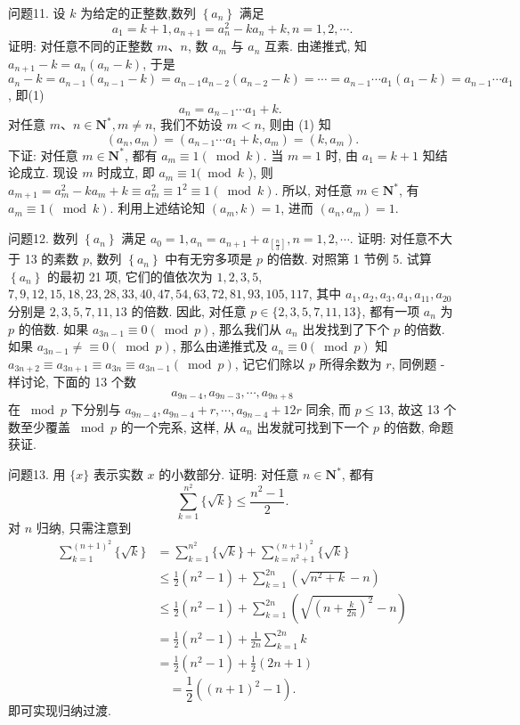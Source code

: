 问题11. 设 $k$ 为给定的正整数,数列 $\left\{a_n\right\}$ 满足
$$
a_1=k+1, a_{n+1}=a_n^2-k a_n+k, n=1,2, \cdots .
$$
证明: 对任意不同的正整数 $m 、 n$, 数 $a_m$ 与 $a_n$ 互素.
由递推式, 知 $a_{n+1}-k=a_n\left(a_n-k\right)$, 于是 $a_n-k=a_{n-1}\left(a_{n-1}-k\right)= a_{n-1} a_{n-2}\left(a_{n-2}-k\right)=\cdots=a_{n-1} \cdots a_1\left(a_1-k\right)=a_{n-1} \cdots a_1$, 即(1)
$$
a_n=a_{n-1} \cdots a_1+k \text {. }
$$
对任意 $m 、 n \in \mathbf{N}^*, m \neq n$, 我们不妨设 $m<n$, 则由 (1) 知
$$
\left(a_n, a_m\right)=\left(a_{n-1} \cdots a_1+k, a_m\right)=\left(k, a_m\right) .
$$
下证: 对任意 $m \in \mathbf{N}^*$, 都有 $a_m \equiv 1(\bmod k)$.
当 $m=1$ 时, 由 $a_1=k+1$ 知结论成立.
现设 $m$ 时成立, 即 $a_m \equiv 1(\bmod k$ ), 则 $a_{m+1}=a_m^2-k a_m+k \equiv a_m^2 \equiv 1^2 \equiv 1(\bmod k)$. 所以, 对任意 $m \in \mathbf{N}^*$, 有 $a_m \equiv 1(\bmod k)$.
利用上述结论知 $\left(a_m, k\right)=1$, 进而 $\left(a_n, a_m\right)=1$.



问题12. 数列 $\left\{a_n\right\}$ 满足 $a_0=1, a_n=a_{n+1}+a_{\left[\frac{n}{3}\right]}, n=1,2, \cdots$. 证明: 对任意不大于 13 的素数 $p$, 数列 $\left\{a_n\right\}$ 中有无穷多项是 $p$ 的倍数.
对照第 1 节例 5. 试算 $\left\{a_n\right\}$ 的最初 21 项, 它们的值依次为 $1,2,3,5$, $7,9,12,15,18,23,28,33,40,47,54,63,72,81,93,105,117$, 其中 $a_1, a_2, a_3, a_4, a_{11}, a_{20}$ 分别是 $2,3,5,7,11,13$ 的倍数.
因此, 对任意 $p \in \{2,3,5,7,11,13\}$, 都有一项 $a_n$ 为 $p$ 的倍数.
如果 $a_{3 n-1} \equiv 0(\bmod p)$, 那么我们从 $a_n$ 出发找到了下个 $p$ 的倍数.
如果 $a_{3 n-1} \neq \equiv 0(\bmod p)$, 那么由递推式及 $a_n \equiv 0(\bmod p)$ 知 $a_{3 n+2} \equiv a_{3 n+1} \equiv a_{3 n} \equiv a_{3 n-1}(\bmod p)$, 记它们除以 $p$ 所得余数为 $r$, 同例题 - 样讨论, 下面的 13 个数
$$
a_{9 n-4}, a_{9 n-3}, \cdots, a_{9 n+8}
$$
在 $\bmod p$ 下分别与 $a_{9 n-4}, a_{9 n-4}+r, \cdots, a_{9 n-4}+12 r$ 同余, 而 $p \leqslant 13$, 故这 13 个数至少覆盖 $\bmod p$ 的一个完系, 这样, 从 $a_n$ 出发就可找到下一个 $p$ 的倍数, 命题获证.



问题13. 用 $\{x\}$ 表示实数 $x$ 的小数部分.
证明: 对任意 $n \in \mathbf{N}^*$, 都有
$$
\sum_{k=1}^{n^2}\{\sqrt{k}\} \leqslant \frac{n^2-1}{2} .
$$
对 $n$ 归纳, 只需注意到
$$
\begin{aligned}
\sum_{k=1}^{(n+1)^2}\{\sqrt{k}\} & =\sum_{k=1}^{n^2}\{\sqrt{k}\}+\sum_{k=n^2+1}^{(n+1)^2}\{\sqrt{k}\} \\
& \leqslant \frac{1}{2}\left(n^2-1\right)+\sum_{k=1}^{2 n}\left(\sqrt{n^2+k}-n\right) \\
& \leqslant \frac{1}{2}\left(n^2-1\right)+\sum_{k=1}^{2 n}\left(\sqrt{\left(n+\frac{k}{2 n}\right)^2}-n\right) \\
& =\frac{1}{2}\left(n^2-1\right)+\frac{1}{2 n} \sum_{k=1}^{2 n} k \\
& =\frac{1}{2}\left(n^2-1\right)+\frac{1}{2}(2 n+1)
\end{aligned}
$$
$$
=\frac{1}{2}\left((n+1)^2-1\right) .
$$
即可实现归纳过渡.



